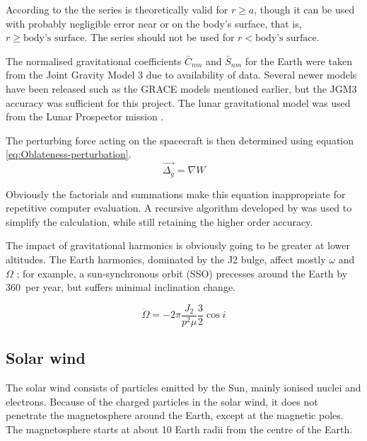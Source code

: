 According to the \textcite{WGS84} the series is theoretically valid for $r\geq a$, though it can be used with probably negligible error near or on the body's surface, that is, $r\geq\text{body's surface}$. The series should not be used for $r<\text{body's surface}$.

The normalised gravitational coefficients $\bar{C}_{nm}$ and $\bar{S}_{nm}$ for the Earth were taken from the Joint Gravity Model 3 \parencite[JGM3,][]{Tapley1996} due to availability of data. Several newer models have been released such as the GRACE models mentioned earlier, but the JGM3 accuracy was sufficient for this project. The lunar gravitational model was used from the Lunar Prospector mission \parencite{Konopliv2001}.

The perturbing force acting on the spacecraft is then determined using equation \eqref{eq:Oblateness-perturbation}.
\begin{equation}\label{eq:Oblateness-perturbation}
\vec{\Delta_g}=\nabla W
\end{equation}

Obviously the factorials and summations make this equation inappropriate for repetitive computer evaluation. A recursive algorithm developed by \textcite{Montenbruck2000} was used to simplify the calculation, while still retaining the higher order accuracy. 

The impact of gravitational harmonics is obviously going to be greater at lower altitudes. The Earth harmonics, dominated by the J2 bulge, affect mostly $\omega$ and $\Omega$ \parencite{Eshagh2007, Montenbruck2000}; for example, a sun-synchronous orbit (SSO) precesses around the Earth by 360\degrees\ per year, but suffers minimal inclination change.

\begin{equation}
\dot\Omega = -2\pi\frac{J_2}{p^2\mu}\frac{3}{2}\cos i
\end{equation}




\subsection{Solar wind} \label{sub:Solar-Wind}

The solar wind consists of particles emitted by the Sun, mainly ionised nuclei and electrons. Because of the charged particles in the solar wind, it does not penetrate the magnetosphere around the Earth, except at the magnetic poles. The magnetosphere starts at about 10 Earth radii from the centre of the Earth.
 
